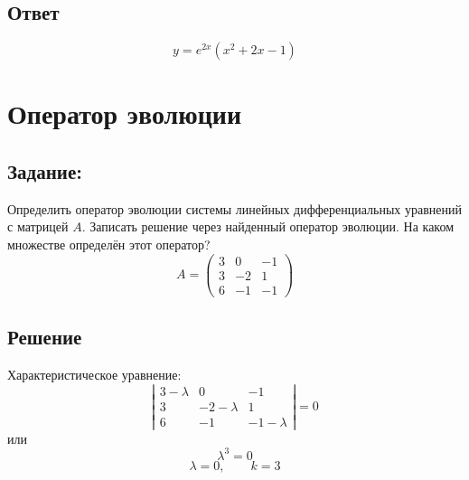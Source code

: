 \documentclass[a4paper,10pt,notitlepage,pdftex,headsepline]{scrartcl}
\begin{document}
\subsection*{Ответ}
\[
y = e^{2 x} (x^2 + 2 x - 1)
\]
\newpage
\section{Оператор эволюции}
\subsection*{Задание:}
Определить оператор эволюции системы линейных дифференциальных уравнений с матрицей $A$.
Записать решение через найденный оператор эволюции.
На каком множестве определён этот оператор?
\[
A = \left(\begin{matrix}
3 & 0 & -1\\
3 & -2& 1\\
6 & -1& -1
\end{matrix}\right)
\]
\subsection*{Решение}
Характеристическое уравнение:
\[
\left|
\begin{matrix}
3-\lambda & 0 & -1\\
3 & -2-\lambda & 1\\
6 & -1 & -1-\lambda
\end{matrix}
\right| = 0
\]
или
\[\lambda^3 = 0\]
\[\lambda = 0,\qquad k = 3\]
\end{document}
